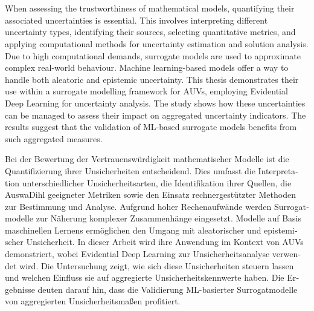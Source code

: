 \chapter{\abstractname}

When assessing the trustworthiness of mathematical models, quantifying their associated uncertainties is essential. This involves interpreting different uncertainty types, identifying their sources, selecting quantitative metrics, and applying computational methods for uncertainty estimation and solution analysis. Due to high computational demands, surrogate models are used to approximate complex real-world behaviour. Machine learning-based models offer a way to handle both aleatoric and epistemic uncertainty. This thesis demonstrates their use within a surrogate modelling framework for AUVs, employing Evidential Deep Learning for uncertainty analysis. The study shows how these uncertainties can be managed to assess their impact on aggregated uncertainty indicators. The results suggest that the validation of ML-based surrogate models benefits from such aggregated measures. \newline

\begin{otherlanguage}{ngerman}
Bei der Bewertung der Vertrauenswürdigkeit mathematischer Modelle ist die Quantifizierung ihrer Unsicherheiten entscheidend. Dies umfasst die Interpretation unterschiedlicher Unsicherheitsarten, die Identifikation ihrer Quellen, die AuswaDihl geeigneter Metriken sowie den Einsatz rechnergestützter Methoden zur Bestimmung und Analyse. Aufgrund hoher Rechenaufwände werden Surrogatmodelle zur Näherung komplexer Zusammenhänge eingesetzt. Modelle auf Basis maschinellen Lernens ermöglichen den Umgang mit aleatorischer und epistemischer Unsicherheit. In dieser Arbeit wird ihre Anwendung im Kontext von AUVs demonstriert, wobei Evidential Deep Learning zur Unsicherheitsanalyse verwendet wird. Die Untersuchung zeigt, wie sich diese Unsicherheiten steuern lassen und welchen Einfluss sie auf aggregierte Unsicherheitskennwerte haben. Die Ergebnisse deuten darauf hin, dass die Validierung ML-basierter Surrogatmodelle von aggregierten Unsicherheitsmaßen profitiert.
\end{otherlanguage}


